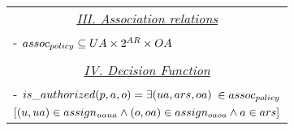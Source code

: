 \begin{table}
\begin{tabular}{|l|}
		 
	 	\multicolumn{1}{|c|}{\underline{\textit{III. Association relations}}} \\
	 	- $assoc_{policy} \subseteq UA \times 2^{AR} \times OA$ \\\\
	 
	 	\multicolumn{1}{|c|}{\underline{\textit{IV. Decision Function}}} \\
	 	 - $is\_authorized(p,a,o) = \exists(ua, ars, oa)$  $\in assoc_{policy}$   \\ \hfill $[ (u,ua) \in assign_{uaua} \land (o,oa) \in assign_{oaoa} \land a \in ars]$ 
	 	 	
		 	
 		\\ \hline	
	\end{tabular}	

	
\end{table}
